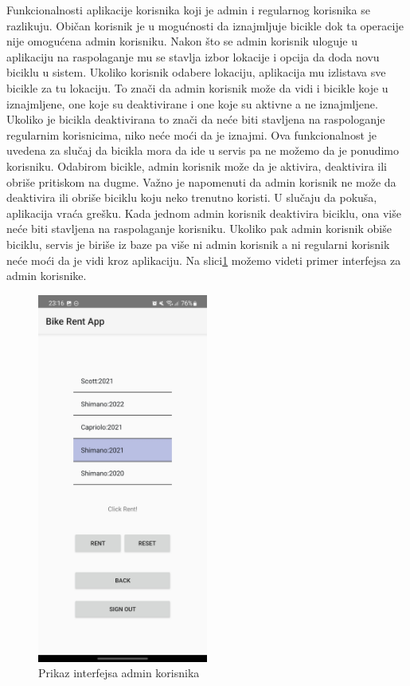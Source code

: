 \documentclass[12pt,oneside]{memoir}
\begin{document}
 
Funkcionalnosti aplikacije korisnika koji je admin i regularnog korisnika se razlikuju. Običan korisnik je u mogućnosti da iznajmljuje bicikle dok ta operacije nije omogućena admin korisniku. Nakon što se admin korisnik uloguje u aplikaciju na raspolaganje mu se stavlja izbor lokacije i opcija da doda novu biciklu u sistem. Ukoliko korisnik odabere lokaciju, aplikacija mu izlistava sve bicikle za tu lokaciju. To znači da admin korisnik može da vidi i bicikle koje u iznajmljene, one koje su deaktivirane i one koje su aktivne a ne iznajmljene. Ukoliko je bicikla deaktivirana to znači da neće biti stavljena na raspologanje regularnim korisnicima, niko neće moći da je iznajmi. Ova funkcionalnost je uvedena za slučaj da bicikla mora da ide u servis pa ne možemo da je ponudimo korisniku. Odabirom bicikle, admin korisnik može da je aktivira, deaktivira ili obriše pritiskom na dugme. Važno je napomenuti da admin korisnik ne može da deaktivira ili obriše biciklu koju neko trenutno koristi. U slučaju da pokuša, aplikacija vraća grešku. Kada jednom admin korisnik deaktivira biciklu, ona više neće biti stavljena na raspolaganje korisniku. Ukoliko pak admin korisnik obiše biciklu, servis je biriše iz baze pa više ni admin korisnik a ni regularni korisnik neće moći da je vidi kroz aplikaciju. Na slici\ref{fig:adminKorisnikInterfejs} možemo videti primer interfejsa za admin korisnike.


\begin{figure}[!ht]
  \centering
  \includegraphics[width=0.5\textwidth]{AdminKorisnikInterfejs.jpg}
  \caption{Prikaz interfejsa admin korisnika}
  \label{fig:adminKorisnikInterfejs}
\end{figure}
\end{document}
